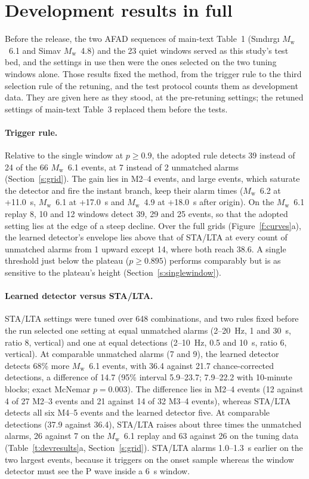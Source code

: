 \documentclass[11pt,a4paper]{article}
\newcommand{\Mw}{$M_\mathrm{w}$}
\newcommand{\stalta}{STA/LTA}
\begin{document}
\clearpage
\section{Development results in full}\label{s:devresults}

Before the release, the two AFAD sequences of main-text Table~1 (S\i{}nd\i{}rg\i{}
\Mw{}~6.1 and Simav \Mw{}~4.8) and the 23 quiet windows served as this study's test
bed, and the settings in use then were the ones selected on the two tuning windows
alone. Those results fixed the method, from the trigger rule to the third selection
rule of the retuning, and the test protocol counts them as development data. They are
given here as they stood, at the pre-retuning settings; the retuned settings of
main-text Table~3 replaced them before the tests.

\paragraph{Trigger rule.} Relative to the single window at $p \geq 0.9$, the adopted
rule detects 39 instead of 24 of the 66 \Mw{}~6.1 events, at 7 instead of 2 unmatched
alarms (Section~\ref{s:grid}). The gain lies in M2--4 events, and large events, which
saturate the detector and fire the instant branch, keep their alarm times (\Mw{}~6.2 at
+11.0~s, \Mw{}~6.1 at +17.0~s and \Mw{}~4.9 at +18.0~s after origin). On the \Mw{}~6.1
replay 8, 10 and 12 windows detect 39, 29 and 25 events, so that the adopted setting
lies at the edge of a steep decline. Over the full grids (Figure~\ref{f:curves}a), the
learned detector's envelope lies above that of \stalta{} at every count of unmatched
alarms from 1 upward except 14, where both reach 38.6. A single threshold just below the
plateau ($p \geq 0.895$) performs comparably but is as sensitive to the plateau's
height (Section~\ref{s:singlewindow}).

\paragraph{Learned detector versus \stalta{}.} \stalta{} settings were tuned over 648
combinations, and two rules fixed before the run selected one setting at equal
unmatched alarms (2--20~Hz, 1 and 30~s, ratio 8, vertical) and one at equal detections
(2--10~Hz, 0.5 and 10~s, ratio 6, vertical). At comparable unmatched alarms (7 and 9),
the learned detector detects 68\% more \Mw{}~6.1 events, with 36.4 against 21.7
chance-corrected detections, a difference of 14.7 (95\% interval 5.9--23.7; 7.9--22.2
with 10-minute blocks; exact McNemar $p = 0.003$). The difference lies in M2--4 events
(12 against 4 of 27 M2--3 events and 21 against 14 of 32 M3--4 events), whereas
\stalta{} detects all six M4--5 events and the learned detector five. At comparable
detections (37.9 against 36.4), \stalta{} raises about three times the unmatched
alarms, 26 against 7 on the \Mw{}~6.1 replay and 63 against 26 on the tuning data
(Table~\ref{t:devresults}a, Section~\ref{s:grid}). \stalta{} alarms 1.0--1.3~s earlier
on the two largest events, because it triggers on the onset sample whereas the window
detector must see the P wave inside a 6~s window.
\end{document}
